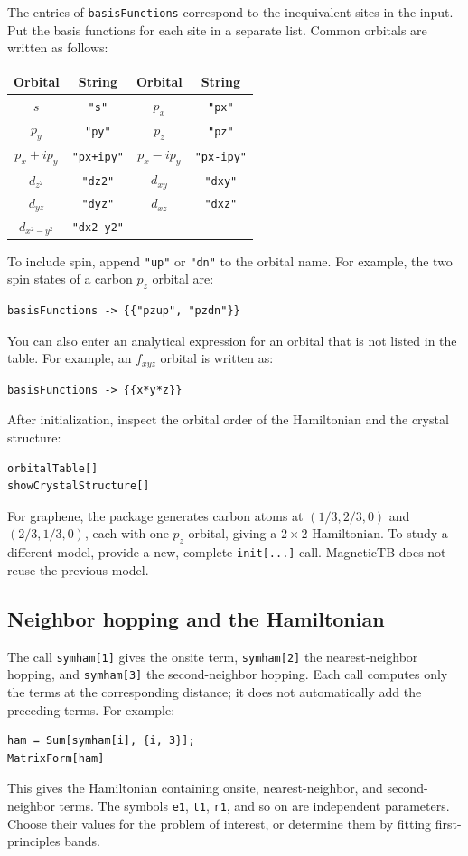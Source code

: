\documentclass[titlepage,a4paper,12pt]{article}
\begin{document}
The entries of \lstinline|basisFunctions| correspond to the inequivalent sites
in the input. Put the basis functions for each site in a separate list.
Common orbitals are written as follows:
\begin{table}[H]
\centering
\begin{tabular}{cc|cc}
\hline
Orbital & String & Orbital & String\\
\hline
$s$ & \lstinline|"s"| & $p_x$ & \lstinline|"px"|\\
$p_y$ & \lstinline|"py"| & $p_z$ & \lstinline|"pz"|\\
$p_x+ip_y$ & \lstinline|"px+ipy"| & $p_x-ip_y$ & \lstinline|"px-ipy"|\\
$d_{z^2}$ & \lstinline|"dz2"| & $d_{xy}$ & \lstinline|"dxy"|\\
$d_{yz}$ & \lstinline|"dyz"| & $d_{xz}$ & \lstinline|"dxz"|\\
$d_{x^2-y^2}$ & \lstinline|"dx2-y2"| & &\\
\hline
\end{tabular}
\end{table}
To include spin, append \lstinline|"up"| or \lstinline|"dn"| to the orbital
name. For example, the two spin states of a carbon $p_z$ orbital are:
\begin{lstlisting}[numbers=none]
basisFunctions -> {{"pzup", "pzdn"}}
\end{lstlisting}
You can also enter an analytical expression for an orbital that is not listed
in the table. For example, an $f_{xyz}$ orbital is written as:
\begin{lstlisting}[numbers=none]
basisFunctions -> {{x*y*z}}
\end{lstlisting}

After initialization, inspect the orbital order of the Hamiltonian and the
crystal structure:
\begin{lstlisting}[numbers=none]
orbitalTable[]
showCrystalStructure[]
\end{lstlisting}
For graphene, the package generates carbon atoms at $(1/3,2/3,0)$ and
$(2/3,1/3,0)$, each with one $p_z$ orbital, giving a $2\times2$ Hamiltonian.
To study a different model, provide a new, complete \lstinline|init[...]| call.
MagneticTB does not reuse the previous model.

\subsection{Neighbor hopping and the Hamiltonian}
The call \lstinline|symham[1]| gives the onsite term,
\lstinline|symham[2]| the nearest-neighbor hopping, and \lstinline|symham[3]|
the second-neighbor hopping. Each call computes only the terms at the
corresponding distance; it does not automatically add the preceding terms.
For example:
\begin{lstlisting}
ham = Sum[symham[i], {i, 3}];
MatrixForm[ham]
\end{lstlisting}
This gives the Hamiltonian containing onsite, nearest-neighbor, and
second-neighbor terms. The symbols \lstinline|e1|, \lstinline|t1|,
\lstinline|r1|, and so on are independent parameters. Choose their values for
the problem of interest, or determine them by fitting first-principles bands.
\end{document}

